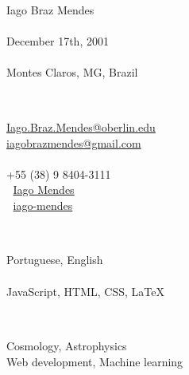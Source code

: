 \documentclass{cv}
\begin{document}
    \firstsection
        {
            \subsection*{}
                \faTag \\
                    Iago Braz Mendes \\
                \faCalendar \\
                    December 17th, 2001 \\
                \faHome \\
                    Montes Claros, MG, Brazil
        }
        {
            \subsection*{}
                \faEnvelopeO \\
                    {\footnotesize \href{mailto:Iago.Braz.Mendes@oberlin.edu}{Iago.Braz.Mendes@oberlin.edu}} \\
                    {\footnotesize \href{mailto:iagobrazmendes@gmail.com}{iagobrazmendes@gmail.com}} \\
                \faPhone \\
                    +55 (38) 9 8404-3111 \\
                \faLinkedin $\;$ \href{https://www.linkedin.com/in/iago-mendes-21a2361a2/}{Iago Mendes} \\
                \faGithub $\;$ \href{https://github.com/iago-mendes}{iago-mendes}
        }
        {
            \subsection*{}
                \faCommentsO \\
                    Portuguese, English \\
                \faCode \\
                    JavaScript, HTML, CSS, \textrm{\LaTeX}
        }
        {
            \subsection*{}
                \faBook \\
                    Cosmology, Astrophysics
                \faDesktop \\
                    Web development, Machine learning
        }
\end{document}
